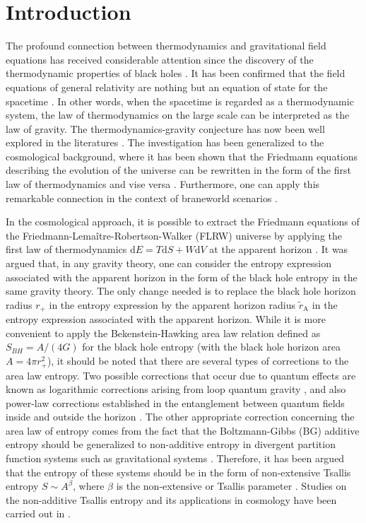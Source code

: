 \documentclass[11pt,twocolumn]{article}
\begin{document}
\section{Introduction}
The profound connection between thermodynamics and gravitational
field equations has received considerable attention since the
discovery of the thermodynamic properties of black holes
\cite{bh1,bh2,bh3}. It has been confirmed that  the field
equations of general relativity are nothing but an equation of
state for the spacetime \cite{j1}. In other words, when the
spacetime is regarded as a thermodynamic system, the law of
thermodynamics on the large scale can be interpreted as the law of
gravity. The thermodynamics-gravity conjecture has now been well
explored in the literatures
\cite{grth1,grth2,grth3,grth4,grth5,grth6,grth7,grth8,grth9}. The
investigation has been generalized to the cosmological background,
where it has been shown that the Friedmann equations describing
the evolution of the universe can be rewritten in the form of the
first law of thermodynamics and vise versa
\cite{fr1,fr2,fr3,fr4,fr5,fr6,fr7,fr8}. Furthermore, one can apply
this remarkable connection in the context of braneworld scenarios
\cite{br1,br2,br3,br4}.

In the cosmological approach, it is possible to extract the
Friedmann equations of the Friedmann-Lema\^itre-Robertson-Walker (FLRW)
universe by applying the first law of
thermodynamics $\mathrm{d}E=T\mathrm{d}S+W\mathrm{d}V$ at the
apparent horizon \cite{fr7}. It was argued that, in any gravity
theory, one can consider the entropy expression associated with
the apparent horizon in the form of the black hole entropy in the
same gravity theory. The only change needed is to replace the
black hole horizon radius $r_{+}$ in the entropy expression by
the apparent horizon radius $\tilde{r}_\mathrm{A}$ in the entropy
expression associated with the apparent horizon. While it is more
convenient to apply the Bekenstein-Hawking area law relation
defined as $S_{BH}={A}/{(4G)}$ for the black hole entropy
\cite{bh4,bh3} (with the black hole horizon area $A=4 \pi
r_{+}^2$), it should be noted that there are several types of
corrections to the area law entropy. Two possible corrections that
occur due to quantum effects are known as logarithmic corrections
arising from loop quantum gravity
\cite{qc1,qc2,qc3,qc4,qc5,qc6,qc7,qc8}, and also power-law
corrections established in the entanglement between quantum fields 
inside and outside the horizon \cite{qc9,qc10,qc11}. The
other appropriate correction concerning the area law of entropy
comes from the fact that the Boltzmann-Gibbs (BG) additive entropy
should be generalized to non-additive entropy in divergent
partition function systems such as gravitational systems
\cite{bg1,na1,na2,na3,na4,na5,na6}. Therefore, it has been argued
that the entropy of these systems should be in the form of
non-extensive Tsallis entropy $S \sim A^{\beta}$, where $\beta$ is
the non-extensive or Tsallis parameter \cite{ts1}. Studies on
the non-additive Tsallis entropy and its applications in cosmology
have been carried out in
\cite{ts2,ts3,ts4,ts5,ts6,ts7,ts8,ts9,ts10,ts11}.
\end{document}

